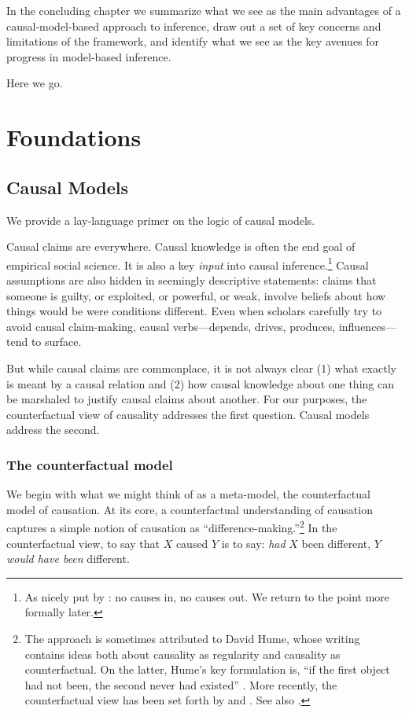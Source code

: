 \documentclass[
  12pt,
]{book}
\newenvironment{headerbox}{
  \definecolor{shadecolor}{rgb}{0.8, 0.8, 0.8}  %
  \color{black}
  \begin{shaded}}{\end{shaded}}
\begin{document}
In the concluding chapter we summarize what we see as the main advantages of a causal-model-based approach to inference, draw out a set of key concerns and limitations of the framework, and identify what we see as the key avenues for progress in model-based inference.

Here we go.

\hypertarget{part-foundations}{%
\part{Foundations}\label{part-foundations}}

\hypertarget{models}{%
\chapter{Causal Models}\label{models}}

\begin{headerbox}
We provide a lay-language primer on the logic of causal models.

\end{headerbox}

Causal claims are everywhere. Causal knowledge is often the end goal of empirical social science. It is also a key \emph{input} into causal inference.\footnote{As nicely put by \citet{cartwright1994nature}: no causes in, no causes out. We return to the point more formally later.}
Causal assumptions are also hidden in seemingly descriptive statements: claims that someone is guilty, or exploited, or powerful, or weak, involve beliefs about how things would be were conditions different. Even when scholars carefully try to avoid causal claim-making, causal verbs---depends, drives, produces, influences---tend to surface.

But while causal claims are commonplace, it is not always clear (1) what exactly is meant by a causal relation and (2) how causal knowledge about one thing can be marshaled to justify causal claims about another. For our purposes, the counterfactual view of causality addresses the first question. Causal models address the second.

\hypertarget{counterfactualmodel}{%
\section{The counterfactual model}\label{counterfactualmodel}}

We begin with what we might think of as a meta-model, the counterfactual model of causation.
At its core, a counterfactual understanding of causation captures a simple notion of causation as ``difference-making.''\footnote{The approach is sometimes attributed to David Hume, whose writing contains ideas both about causality as regularity and causality as counterfactual. On the latter, Hume's key formulation is, ``if the first object had not been, the second never had existed'' \citep[Section VIII]{hume2000enquiry}. More recently, the counterfactual view has been set forth by \citet{splawa1990application} and \citet{lewis1973counterfactuals}. See also \citet{lewis1986causation}.} In the counterfactual view, to say that \(X\) caused \(Y\) is to say: \emph{had} \(X\) been different, \(Y\) \emph{would have been} different.
\end{document}
